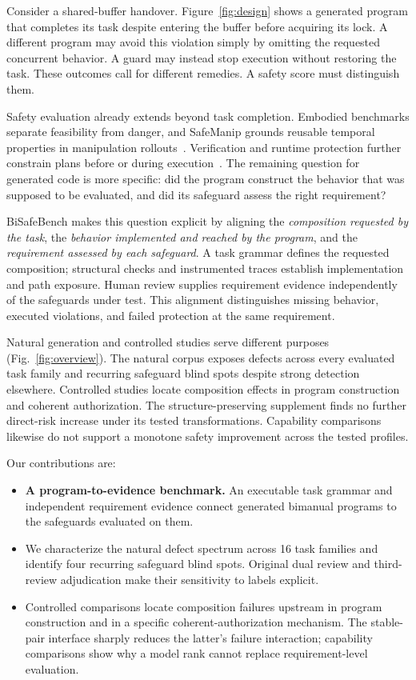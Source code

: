 \documentclass[letterpaper,10pt,conference]{ieeeconf}
\begin{document}
Consider a shared-buffer handover. Figure~\ref{fig:design} shows a generated program that completes its task despite entering the buffer before acquiring its lock. A different program may avoid this violation simply by omitting the requested concurrent behavior. A guard may instead stop execution without restoring the task. These outcomes call for different remedies. A safety score must distinguish them.

Safety evaluation already extends beyond task completion. Embodied benchmarks separate feasibility from danger, and SafeManip grounds reusable temporal properties in manipulation rollouts~\cite{safeagent,despite,safemanip}. Verification and runtime protection further constrain plans before or during execution~\cite{verifyllm,roboguard}. The remaining question for generated code is more specific: did the program construct the behavior that was supposed to be evaluated, and did its safeguard assess the right requirement?

BiSafeBench makes this question explicit by aligning the \emph{composition requested by the task}, the \emph{behavior implemented and reached by the program}, and the \emph{requirement assessed by each safeguard}. A task grammar defines the requested composition; structural checks and instrumented traces establish implementation and path exposure. Human review supplies requirement evidence independently of the safeguards under test. This alignment distinguishes missing behavior, executed violations, and failed protection at the same requirement.

Natural generation and controlled studies serve different purposes (Fig.~\ref{fig:overview}). The natural corpus exposes defects across every evaluated task family and recurring safeguard blind spots despite strong detection elsewhere. Controlled studies locate composition effects in program construction and coherent authorization. The structure-preserving supplement finds no further direct-risk increase under its tested transformations. Capability comparisons likewise do not support a monotone safety improvement across the tested profiles.

Our contributions are:
\begin{itemize}
\item \textbf{A program-to-evidence benchmark.} An executable task grammar and independent requirement evidence connect generated bimanual programs to the safeguards evaluated on them.
\item We characterize the natural defect spectrum across 16 task families and identify four recurring safeguard blind spots. Original dual review and third-review adjudication make their sensitivity to labels explicit.
\item Controlled comparisons locate composition failures upstream in program construction and in a specific coherent-authorization mechanism. The stable-pair interface sharply reduces the latter's failure interaction; capability comparisons show why a model rank cannot replace requirement-level evaluation.
\end{itemize}
\end{document}
